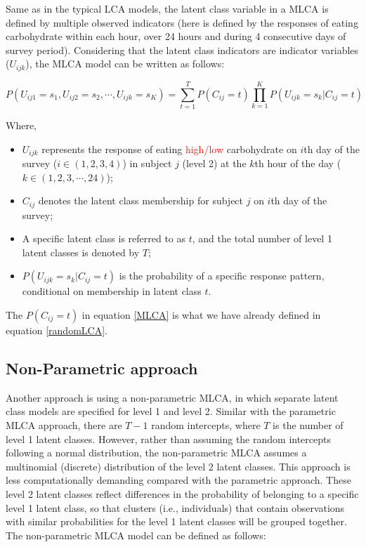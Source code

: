 Same as in the typical LCA models, the latent class variable in a MLCA is defined by multiple observed indicators (here is defined by the responses of eating carbohydrate within each hour, over 24 hours and during 4 consecutive days of survey period). Considering that the latent class indicators are indicator variables ($U_{ijk}$), the MLCA model can be written as follows:\vspace{-0.8cm}

\begin{equation}
P(U_{ij1} = s_1, U_{ij2} = s_2, \cdots, U_{ijk} = s_{K}) = \sum_{t=1}^{T}P(C_{ij}=t)\prod_{k=1}^{K}P(U_{ijk} = s_k | C_{ij} = t)
\label{MLCA}
\end{equation}
\vspace{-0.8cm}


Where, 

\begin{itemize}
	\item $ U_{ijk} $ represents the response of eating \textcolor{red}{high/low} carbohydrate on $i$th day of the survey ($i \in (1,2,3,4)$) in subject $j$ (level 2) at the $k$th hour of the day ($k \in (1, 2, 3, \cdots, 24)$);
	\item $C_{ij}$ denotes the latent class membership for subject $j$ on $i$th day of the survey;
	\item A specific latent class is referred to as $t$, and the total number of level 1 latent classes is denoted by $T$;
	\item $P(U_{ijk} = s_k|C_{ij} = t)$ is the probability of a specific response pattern, conditional on membership in latent class $t$.
\end{itemize}


The $P(C_{ij} = t)$ in equation \ref{MLCA} is what we have already defined in equation \ref{randomLCA}.

\vspace{-0.5cm}
\subsection{Non-Parametric approach}\vspace{-0.3cm}


Another approach is using a non-parametric MLCA, in which separate latent class models are specified for level 1 and level 2. Similar with the parametric MLCA approach, there are $T-1$ random intercepts, where $T$ is the number of level 1 latent classes. However, rather than assuming the random intercepts following a normal distribution, the non-parametric MLCA assumes a multinomial (discrete) distribution of the level 2 latent classes. This approach is less computationally demanding compared with the parametric approach. These level 2 latent
classes reflect differences in the probability of belonging to a specific level 1 latent class, so that clusters (i.e., individuals) that contain observations with similar probabilities for the level 1 latent classes will be grouped together. The non-parametric MLCA model can be defined as follows: \vspace{-0.7cm}

